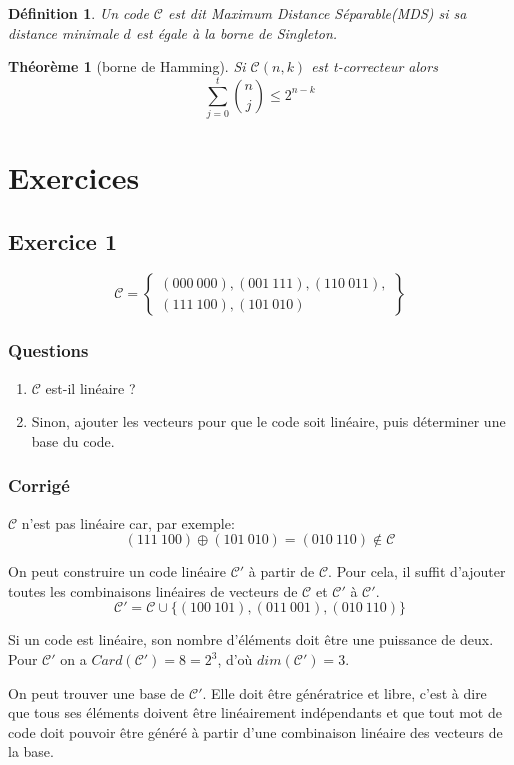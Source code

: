 \documentclass[a4paper,10pt,twocolumn]{article}
\theoremstyle{break}
\newcommand{\code}[1]{\mathcal{#1}}
\newcommand{\C}{\code{C}}
\newtheorem{mydef}{Définition}
\newtheorem{myth}{Théorème}
\begin{document}
\begin{mydef}
 Un code $\C$ est dit \flqq Maximum Distance Séparable\frqq  (MDS) si sa distance minimale $d$ est égale à la borne de Singleton.
\end{mydef}

\begin{myth}[borne de Hamming]
 Si $\C(n,k)$ est t-correcteur alors 
$$ \sum_{j=0}^t {n \choose j} \le 2^{n-k} $$
\end{myth}

\section{Exercices}
\subsection*{Exercice 1}
$$ \C = \left\{ \begin{array}{l}
 (000\ 000), (001\ 111), (110\ 011), \\
 (111\ 100), (101\ 010)
\end{array}\right\}$$

\subsubsection*{Questions}
\begin{enumerate}
 \item $\C$ est-il linéaire ?
 \item Sinon, ajouter les vecteurs pour que le code soit linéaire, puis déterminer une base du code.
\end{enumerate}

\subsubsection*{Corrigé}
$\C$ n'est pas linéaire car, par exemple:
$$ (111\ 100) \oplus (101\ 010) = (010\ 110) \not\in \C $$

On peut construire un code linéaire $\C'$ à partir de $\C$. Pour cela, il suffit d'ajouter toutes les combinaisons linéaires de vecteurs de $\C$ et $\C'$ à $\C'$.
$$ \C' = \C \cup \{ (100\ 101), (011\ 001), (010\ 110)\} $$

Si un code est linéaire, son nombre d'éléments doit être une puissance de deux. Pour $\C'$ on a $Card(\C') = 8 = 2^3$, d'où $dim(\C') = 3$.

On peut trouver une base de $\C'$. Elle doit être génératrice et libre, c'est à dire que tous ses éléments doivent être linéairement indépendants et que tout mot de code doit pouvoir être généré à partir d'une combinaison linéaire des vecteurs de la base.
\end{document}
